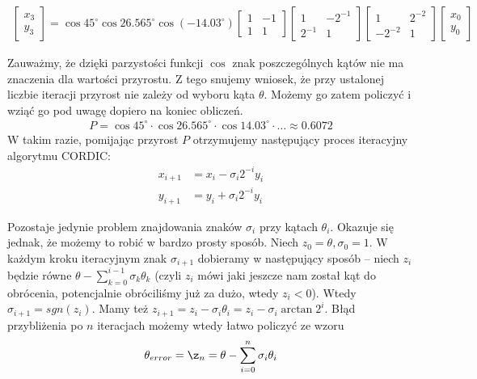 \documentclass[12pt]{extarticle}
\theoremstyle{remark}
\theoremstyle{definition}
\theoremstyle{definition}
\begin{document}
\begin{align}
  \begin{bmatrix}
    x_3 \\ y_3
  \end{bmatrix}
  = \cos 45^{\circ}\cos 26.565^{\circ}\cos(-14.03^{\circ})
  \begin{bmatrix}
    1 & -1 \\
    1 & 1
  \end{bmatrix}
  \begin{bmatrix}
    1      & -2^{-1} \\
    2^{-1} & 1
  \end{bmatrix}
  \begin{bmatrix}
    1      &  2^{-2} \\
    -2^{-2} & 1
  \end{bmatrix}
  \begin{bmatrix}
    x_0 \\ y_0
  \end{bmatrix}
\end{align}

Zauważmy, że dzięki parzystości funkcji $\cos$ znak poszczególnych kątów nie ma znaczenia dla wartości przyrostu. Z tego snujemy wniosek, że przy ustalonej liczbie iteracji przyrost nie zależy od wyboru kąta $\theta$. Możemy go zatem policzyć i wziąć go pod uwagę dopiero na koniec obliczeń.
\begin{align}
  P = \cos 45^{\circ}\cdot\cos 26.565^{\circ}\cdot\cos 14.03^{\circ}\cdot\ldots \approx 0.6072
\end{align}
W takim razie, pomijając przyrost $P$ otrzymujemy następujący proces iteracyjny algorytmu CORDIC:
\begin{align}
  x_{i + 1} & = x_{i} - \sigma_i 2^{-i}y_i \\
  y_{i + 1} & = y_i + \sigma_i 2^{-i}y_i
\end{align}

Pozostaje jedynie problem znajdowania znaków $\sigma_i$ przy kątach $\theta_i$. Okazuje się jednak, że możemy to robić w bardzo prosty sposób. Niech $z_0 = \theta, \sigma_0 = 1$. W każdym kroku iteracyjnym znak $\sigma_{i + 1}$ dobieramy w następujący sposób -- niech $z_{i}$ będzie równe $\theta - \sum_{k=0}^{i - 1}\sigma_k\theta_k$ (czyli $z_i$ mówi jaki jeszcze nam został kąt do obrócenia, potencjalnie obróciliśmy już za dużo, wtedy $z_i < 0$). Wtedy $\sigma_{i + 1} = sgn(z_i)$. Mamy też $z_{i + 1} = z_{i} - \sigma_i\theta_i = z_{i} - \sigma_i\arctan{2^{i}}$. Błąd przybliżenia po $n$ iteracjach możemy wtedy łatwo policzyć ze wzoru 
\begin{align}
  \theta_{error} = \z_n = \theta - \sum_{i=0}^n\sigma_i \theta_i
\end{align}
\end{document}
